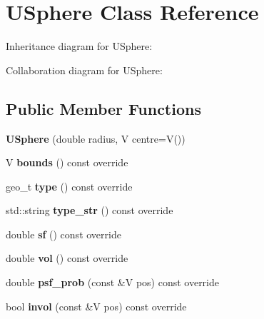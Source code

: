 \hypertarget{classUSphere}{}\section{U\+Sphere Class Reference}
\label{classUSphere}


Inheritance diagram for U\+Sphere\+:


Collaboration diagram for U\+Sphere\+:
\subsection*{Public Member Functions}
\begin{DoxyCompactItemize}
\item 
\mbox{\label{classUSphere_a391d842fc09511936f7ef19f2bfbda86}} 
{\bfseries U\+Sphere} (double radius, V centre=V())
\item 
\mbox{\label{classUSphere_a5f606b06c2421eb764bebf66ff9bea6c}} 
V {\bfseries bounds} () const override
\item 
\mbox{\label{classUSphere_a37878e7fdf67d7adae24ecfda74980a7}} 
geo\+\_\+t {\bfseries type} () const override
\item 
\mbox{\label{classUSphere_a2ca8e64246f9ed210b9eb61e2544617d}} 
std\+::string {\bfseries type\+\_\+str} () const override
\item 
\mbox{\label{classUSphere_af9c5ce6a28505fdaf5af0d219889b381}} 
double {\bfseries sf} () const override
\item 
\mbox{\label{classUSphere_a694cfe3b36042de50cdb6416315e9768}} 
double {\bfseries vol} () const override
\item 
\mbox{\label{classUSphere_a2b746bd16d9be3627e45e38b2e4073bc}} 
double {\bfseries psf\+\_\+prob} (const \&V pos) const override
\item 
\mbox{\label{classUSphere_ab8ad07e4c2f0e1217e063b9d40d8dbad}} 
bool {\bfseries invol} (const \&V pos) const override
\end{DoxyCompactItemize}
